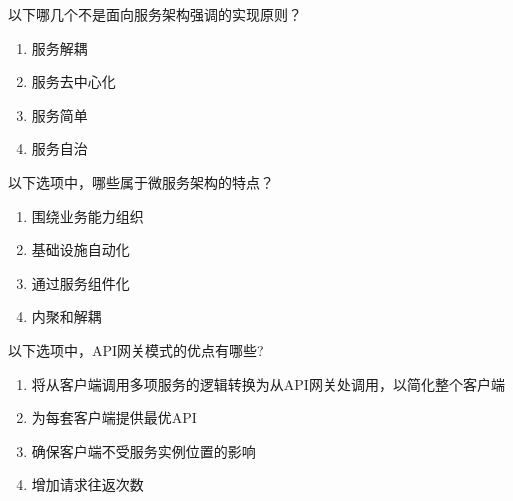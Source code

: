 \begin{problem}
	以下哪几个不是面向服务架构强调的实现原则？
    \vspace{-0.8em}
    \begin{multicols}{4}
        \begin{enumerate}[label=\Alph*.]
            \item 服务解耦
            \item 服务去中心化
            \item 服务简单
            \item 服务自治
        \end{enumerate}
    \end{multicols}
    \vspace{-1em}
\end{problem}



\begin{problem}
	‌以下选项中，哪些属于微服务架构的特点？
    \vspace{-0.8em}
    \begin{multicols}{4}
        \begin{enumerate}[label=\Alph*.]
            \item 围绕业务能力组织
            \item 基础设施自动化
            \item 通过服务组件化
            \item 内聚和解耦
        \end{enumerate}
    \end{multicols}
    \vspace{-1em}
\end{problem}



\begin{problem}
	以下选项中，API网关模式的优点有哪些?
        \begin{enumerate}[label=\Alph*.]
            \item 将从客户端调用多项服务的逻辑转换为从API网关处调用，以简化整个客户端
            \item 为每套客户端提供最优API
            \item 确保客户端不受服务实例位置的影响
            \item 增加请求往返次数
        \end{enumerate}
\end{problem}



